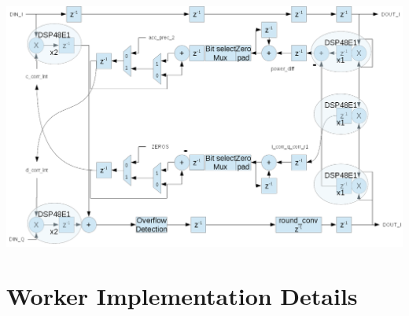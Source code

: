\documentclass{article}
\begin{document}
{\centering\captionsetup{type=figure}\includegraphics[scale=0.5]{iq_imbalance_block_diagram}\par{}\label{fig:iq_imbalance_block_diagram}}
\newpage

\section*{Worker Implementation Details}
\end{document}
